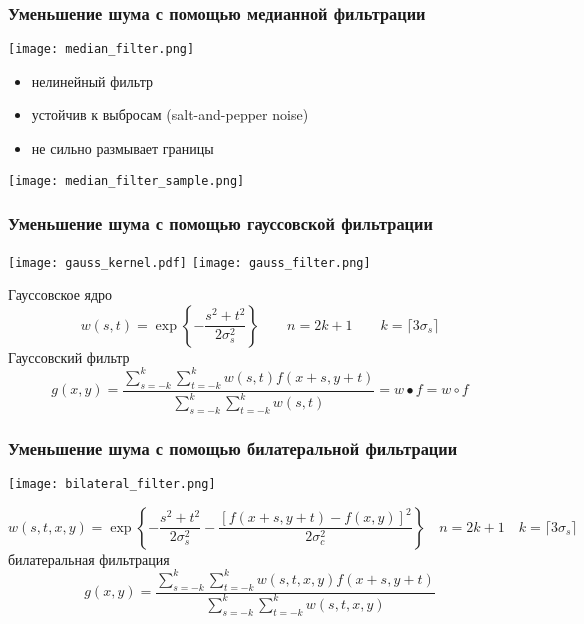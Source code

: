 \documentclass[
    12pt, 
    usepdftitle=false,
    aspectratio=1610
]{beamer}
\begin{document}
\begin{frame}
    \frametitle{Уменьшение шума с помощью медианной фильтрации}
    \begin{center}
        \texttt{[image: median\_filter.png]}
    \end{center}
    \begin{itemize}
        \item нелинейный фильтр
        \item устойчив к выбросам (salt-and-pepper noise)
        \item не сильно размывает границы
    \end{itemize}
    \begin{center}
        \texttt{[image: median\_filter\_sample.png]}
    \end{center}
\end{frame}

\begin{frame}
\frametitle{Уменьшение шума с помощью гауссовской фильтрации}
\begin{center}
    \texttt{[image: gauss\_kernel.pdf]}
    \texttt{[image: gauss\_filter.png]}
\end{center}
Гауссовское ядро
$$
    w(s,t)=\exp\left\{-\frac{s^2+t^2}{2\sigma_s^2}\right\}
    \qquad n = 2k+1\qquad k=\lceil 3\sigma_s\rceil
$$
Гауссовский фильтр
$$
    g(x,y)=\frac{\sum\limits_{s=-k}^k\sum\limits_{t=-k}^k w(s,t)f(x+s,y+t)}{\sum\limits_{s=-k}^k\sum\limits_{t=-k}^kw(s,t)}=
    w\bullet f=w\circ f
$$
\end{frame}

\begin{frame}
\frametitle{Уменьшение шума с помощью билатеральной фильтрации}
\begin{center}
    \texttt{[image: bilateral\_filter.png]}
\end{center}
$$
    w(s,t,x,y)=\exp\left\{-\frac{s^2+t^2}{2\sigma_s^2}-\frac{\left[f(x+s,y+t)-f(x,y)\right]^2}{2\sigma_c^2}\right\}
    \quad n = 2k+1\quad k=\lceil 3\sigma_s\rceil
$$
билатеральная фильтрация
$$
    g(x,y)=\frac{\sum\limits_{s=-k}^k\sum\limits_{t=-k}^k w(s,t,x,y)f(x+s,y+t)}{\sum\limits_{s=-k}^k\sum\limits_{t=-k}^kw(s,t,x,y)}
$$
\end{frame}

\end{document}
